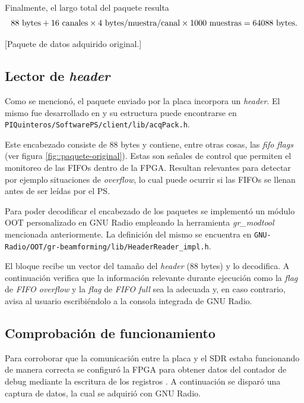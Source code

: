 \documentclass[../../main.tex]{subfiles}
\begin{document}
Finalmente, el largo total del paquete resulta \[88~\textrm{bytes} + 16~\textrm{canales} \times 4~\textrm{bytes/muestra/canal} \times 1000~\textrm{muestras} = 64088~\textrm{bytes}.\]

[Paquete de datos adquirido original.]


\subsection{Lector de \textit{header}}
Como se mencionó, el paquete enviado por la placa incorpora un \textit{header}. El mismo fue desarrollado en \cite{proyecto-jose} y su estructura puede encontrarse en \texttt{PIQuinteros/SoftwarePS/client/lib/acqPack.h}.

Este encabezado consiste de 88 bytes y contiene, entre otras cosas, las \textit{fifo flags} (ver figura \ref{fig::paquete-original}). Estas son señales de control que permiten el monitoreo de las FIFOs dentro de la FPGA. Resultan relevantes para detectar por ejemplo situaciones de \textit{overflow}, lo cual puede ocurrir si las FIFOs se llenan antes de ser leídas por el PS.

Para poder decodificar el encabezado de los paquetes se implementó un módulo OOT personalizado en GNU Radio empleando la herramienta \textit{gr\_modtool} mencionada anteriormente. La definición del mismo se encuentra en \texttt{GNU-Radio/OOT/gr-beamforming/lib/HeaderReader\_impl.h}. 

El bloque recibe un vector del tamaño del \textit{header} (88 bytes) y lo decodifica. A continuación verifica que la información relevante durante ejecución como la \textit{flag} de \textit{FIFO overflow} y la \textit{flag} de \textit{FIFO full} sea la adecuada y, en caso contrario, avisa al usuario escribiéndolo a la consola integrada de GNU Radio.


\subsection{Comprobación de funcionamiento}
Para corroborar que la comunicación entre la placa y el SDR estaba funcionando de manera correcta se configuró la FPGA para obtener datos del contador de debug mediante la escritura de los registros . A continuación se disparó una captura de datos, la cual se adquirió con GNU Radio.
\end{document}
